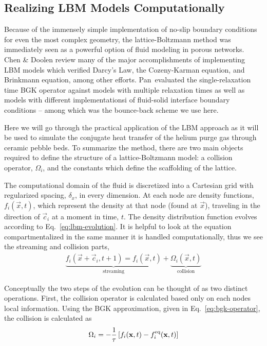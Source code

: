\subsection{Realizing LBM Models Computationally}
Because of the immensely simple implementation of no-slip boundary conditions for even the most complex geometry, the lattice-Boltzmann method was immediately seen as a powerful option of fluid modeling in porous networks. Chen \& Doolen review many of the major accomplishments of implementing LBM models which verified Darcy's Law, the Cozeny-Karman equation, and Brinkmann equation, among other efforts.\cite{Chen1998a} Pan\etal~evaluated the single-relaxation time BGK operator against models with multiple relaxation times as well as models with different implementationsi of fluid-solid interface boundary conditions -- among which was the bounce-back scheme we use here.\cite{Pan2006}

Here we will go through the practical application of the LBM approach as it will be used  to simulate the conjugate heat transfer of the helium purge gas through ceramic pebble beds. To summarize the method, there are two main objects required to define the structure of a lattice-Boltzmann model: a collision operator, $\Omega_i$, and the constants which define the scaffolding of the lattice.

The computational domain of the fluid is discretized into a Cartesian grid with regularized spacing, $\delta_x$, in every dimension. At each node are density functions, $f_i(\vec{x},t)$, which represent the density at that node (found at $\vec{x}$), traveling in the direction of $\vec{c}_i$ at a moment in time, $t$. The density distribution function evolves according to Eq.~\ref{eq:lbm-evolution}. It is helpful to look at the equation compartmentalized in the same manner it is handled computationally, thus we see the streaming and collision parts,
\begin{align}
	\underbrace{f_i(\vec{x}+\vec{c}_i, t + 1)  = f_i(\vec{x},t)}_\text{streaming}  + \underbrace{\Omega_i(\vec{x},t)}_\text{collision}
\end{align}

Conceptually the two steps of the evolution can be thought of as two distinct operations. First, the collision operator is calculated based only on each nodes local information. Using the BGK approximation, given in Eq.~\ref{eq:bgk-operator}, the collision is calculated as
\begin{align}
	\Omega_i = -\frac{1}{\tau}\left[f_i(\mathbf{x},t) - f_i^{\text{eq}}(\mathbf{x},t)\right]
\end{align}

